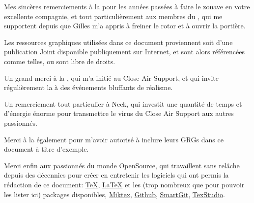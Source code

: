 %

\begin{imini}
Mes sincères remerciements à la \thirdwing{} pour les années passées à faire le zouave en votre excellente compagnie, et tout particulièrement aux membres du \rgt{} \inmem{}, qui me supportent depuis que Gilles m'a appris à freiner le rotor et à ouvrir la portière.

Les ressources graphiques utilisées dans ce document proviennent soit d'une publication Joint disponible publiquement sur Internet, et sont alors référencées comme telles, ou sont libre de droits.

Un grand merci à la \onethreetwo{}, qui m'a initié au Close Air Support, et qui invite régulièrement la \thirdwing{} à des événements bluffants de réalisme.


Un remerciement tout particulier à Neck, qui investit une quantité de temps et d'énergie énorme pour transmettre le virus du Close Air Support aux autres passionnés.


Merci à la \onethreetwo{} également pour m'avoir autorisé à inclure leurs GRGs dans ce document à titre d'exemple.

%
%
Merci enfin aux passionnés du monde OpenSource, qui travaillent sans relâche depuis des décennies pour créer en entretenir les logiciels qui ont permis la rédaction de ce document:
\href{https://www.tug.org/}{TeX}, \href{https://www.latex-project.org/}{\LaTeX} et les (trop nombreux que pour pouvoir les lister ici) packages disponibles, \href{http://miktex.org/}{Miktex}, \href{https://github.com/}{Github}, \href{https://www.syntevo.com/smartgit/}{SmartGit}, \href{http://www.texstudio.org/}{TexStudio}.%



\end{imini}